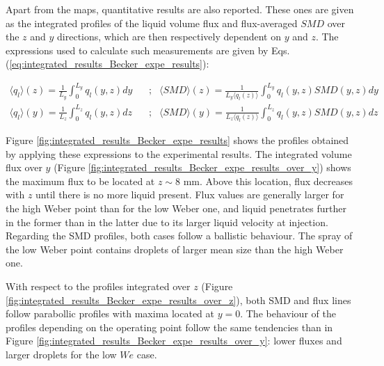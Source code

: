 \vspace*{-0.1in}

Apart from the maps, quantitative results are also reported. These ones are given as the integrated profiles of the liquid volume flux and flux-averaged $SMD$ over the $z$ and $y$ directions, which are then respectively dependent on $y$ and $z$. The expressions used to calculate such measurements are given by Eqs. (\ref{eq:integrated_results_Becker_expe_results}):

\vspace*{-0.1in}

\begin{subequations}
\label{eq:integrated_results_Becker_expe_results}
\begin{align}
\langle q_l \rangle \left( z \right)  = \frac{1}{L_y} \int_0^{L_y} q_l \left( y, z \right) dy    & ~~~~  ; & \langle SMD \rangle \left( z \right) = \frac{1}{L_y \langle q_l \left( z \right) \rangle} \int_0^{L_y} q_l \left( y, z \right) SMD \left( y, z \right) dy \\
\langle q_l  \rangle \left( y \right) = \frac{1}{L_z} \int_0^{L_z} q_l \left( y, z \right) dz    & ~~~~  ; & \langle SMD \rangle  \left( y \right)  =  \frac{1}{L_z \langle q_l \left( z \right) \rangle} \int_0^{L_z} q_l \left( y, z \right) SMD \left( y, z \right) dz
\end{align}
\end{subequations}



Figure \ref{fig:integrated_results_Becker_expe_results} shows the profiles obtained by applying these expressions to the experimental results. The integrated volume flux over $y$ (Figure \ref{fig:integrated_results_Becker_expe_results_over_y}) shows the maximum flux to be located at $z \sim 8$ mm. Above this location, flux decreases with $z$ until there is no more liquid present. Flux values are generally larger for the high Weber point than for the low Weber one, and liquid penetrates further in the former than in the latter due to its larger liquid velocity at injection. Regarding the SMD profiles, both cases follow a ballistic behaviour. The spray of the low Weber point contains droplets of larger mean size than the high Weber one.

With respect to the profiles integrated over $z$ (Figure \ref{fig:integrated_results_Becker_expe_results_over_z}), both SMD and flux lines follow parabollic profiles with maxima located at $y = 0$. The behaviour of the profiles depending on the operating point follow the same tendencies than in Figure \ref{fig:integrated_results_Becker_expe_results_over_y}: lower fluxes and larger droplets for the low $We$ case.



